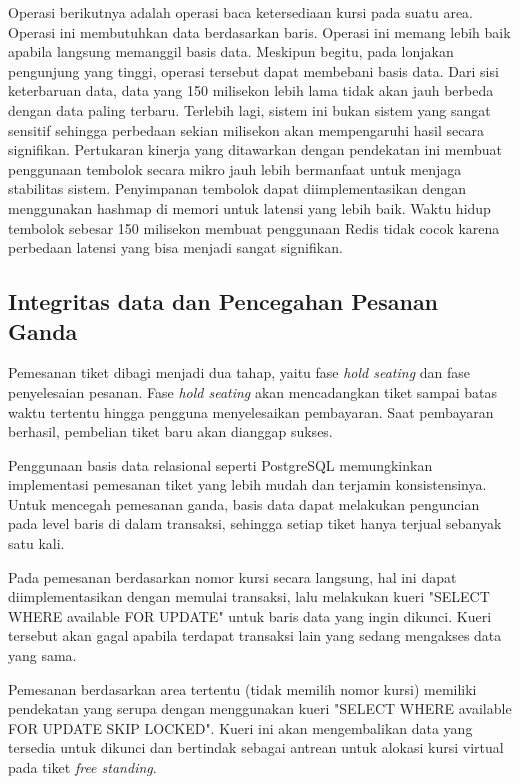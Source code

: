 Operasi berikutnya adalah operasi baca ketersediaan kursi pada suatu area. Operasi ini membutuhkan data berdasarkan baris. Operasi ini memang lebih baik apabila langsung memanggil basis data. Meskipun begitu, pada lonjakan pengunjung yang tinggi, operasi tersebut dapat membebani basis data. Dari sisi keterbaruan data, data yang 150 milisekon lebih lama tidak akan jauh berbeda dengan data paling terbaru. Terlebih lagi, sistem ini bukan sistem yang sangat sensitif sehingga perbedaan sekian milisekon akan mempengaruhi hasil secara signifikan. Pertukaran kinerja yang ditawarkan dengan pendekatan ini membuat penggunaan tembolok secara mikro jauh lebih bermanfaat untuk menjaga stabilitas sistem. Penyimpanan tembolok dapat diimplementasikan dengan menggunakan hashmap di memori untuk latensi yang lebih baik. Waktu hidup tembolok sebesar 150 milisekon membuat penggunaan Redis tidak cocok karena perbedaan latensi yang bisa menjadi sangat signifikan.

\subsection{Integritas data dan Pencegahan Pesanan Ganda}

Pemesanan tiket dibagi menjadi dua tahap, yaitu fase \textit{hold seating} dan fase penyelesaian pesanan. Fase \textit{hold seating} akan mencadangkan tiket sampai batas waktu tertentu hingga pengguna menyelesaikan pembayaran. Saat pembayaran berhasil, pembelian tiket baru akan dianggap sukses.

Penggunaan basis data relasional seperti PostgreSQL memungkinkan implementasi pemesanan tiket yang lebih mudah dan terjamin konsistensinya. Untuk mencegah pemesanan ganda, basis data dapat melakukan penguncian pada level baris di dalam transaksi, sehingga setiap tiket hanya terjual sebanyak satu kali.

Pada pemesanan berdasarkan nomor kursi secara langsung, hal ini dapat diimplementasikan dengan memulai transaksi, lalu melakukan kueri "SELECT WHERE available FOR UPDATE" untuk baris data yang ingin dikunci. Kueri tersebut akan gagal apabila terdapat transaksi lain yang sedang mengakses data yang sama.

Pemesanan berdasarkan area tertentu (tidak memilih nomor kursi) memiliki pendekatan yang serupa dengan menggunakan kueri "SELECT WHERE available FOR UPDATE SKIP LOCKED". Kueri ini akan mengembalikan data yang tersedia untuk dikunci dan bertindak sebagai antrean untuk alokasi kursi virtual pada tiket \textit{free standing}.

